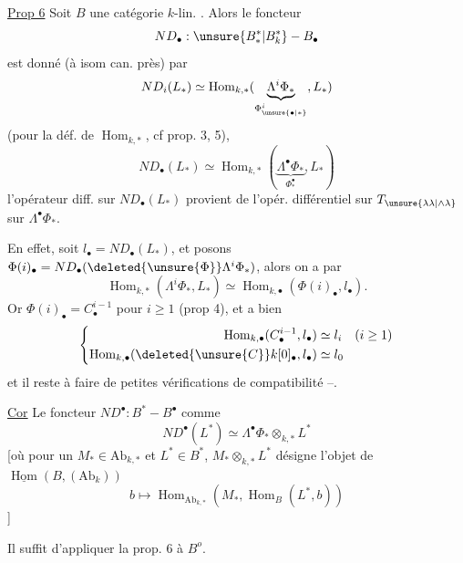 \uline{Prop 6} Soit $B$ une catégorie $k$-lin. .
Alors le foncteur
\[
ND_\bullet:\unsure{B^*_*|B^*_k}\mathbin{-}B_\bullet
\]
est donné (à isom can. près) par
\[
ND_i(L_*)\simeq\operatorname{Hom}_{k,*}
(\underbrace{\Lambda^i\Phi_*}_{\Phi^i_{\unsure{\bullet|*}}},L_*)
\]
(pour la déf. de $\operatorname{Hom}_{k,*}$, cf prop. 3, 5),
\[
ND_\bullet(L_*)\simeq\operatorname{Hom}_{k,*}
(\underbrace{\Lambda^\bullet\Phi_*}_{\Phi_*^\bullet},L_*)
\]
l'opérateur diff. sur $ND_\bullet(L_*)$ provient de l'opér. différentiel sur
$T_{\unsure{\lambda\lambda|\wedge\lambda}}$ sur $\Lambda^\bullet\Phi_*$.

En effet,  soit $l_\bullet=ND_\bullet(L_*)$,
et posons $\Phi(i)_\bullet=ND_\bullet(\deleted{\unsure{\Phi}}\Lambda^i\Phi_*)$,
alors on a par 
\[
\operatorname{Hom}_{k,*}(\Lambda^i\Phi_*,L_*)
\simeq\operatorname{Hom}_{k,\bullet}(\Phi(i)_\bullet,l_\bullet).
\]
Or $\Phi(i)_\bullet=C_\bullet^{i-1}$ pour $i\geq1$ (prop 4), et
a bien
\[
\left\{\begin{aligned}
\operatorname{Hom}_{k,\bullet}(C_\bullet^{i-1},l_\bullet)&\simeq l_i\quad(i\geq1)\\
\operatorname{Hom}_{k,\bullet}(\deleted{\unsure{C}}k[0]_\bullet,l_\bullet)&\simeq l_0
\end{aligned}\right.
\]
et il reste à faire de petites vérifications de compatibilité --.

\uline{Cor} Le foncteur $ND^\bullet:B^*\mathbin{-}B^\bullet$  comme
\[
ND^\bullet(L^*)\simeq\Lambda^\bullet\Phi_*\otimes_{k,*}L^*
\]
[où pour un $M_*\in\mathrm{Ab}_{k,*}$ et $L^*\in B^*$,
$M_*\otimes_{k,*}L^*$ désigne l'objet de $\underline{\operatorname{Hom}}(B,(\mathrm{Ab}_k))$
\[
b\longmapsto\operatorname{Hom}_{\mathrm{Ab}_{k,*}}
(M_*,\operatorname{Hom}_{B}(L^*,b))
\]
]

Il suffit d'appliquer la prop. 6 à $B^o$.
